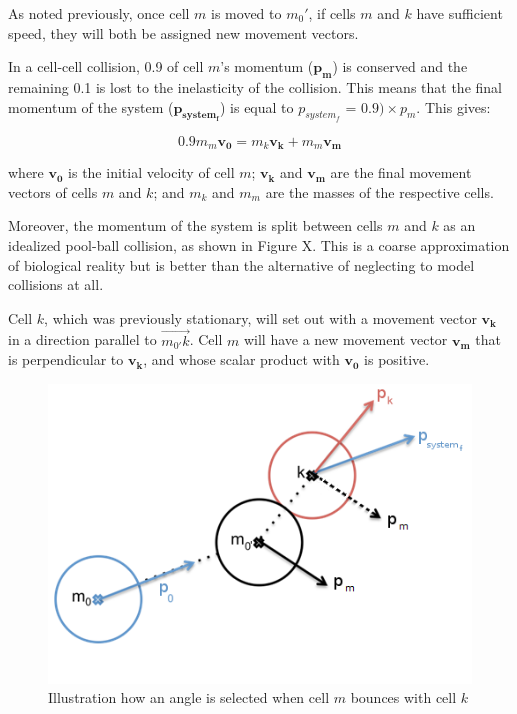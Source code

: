 \documentclass[12pt]{article}
\begin{document}
As noted previously, once cell \(m\) is moved to \(m_0'\), if 
cells \(m\) and \(k\) have sufficient speed, they will both be assigned new movement vectors.

In a cell-cell collision, 0.9 of cell \(m\)'s momentum (\(\mathbf{p_m}\)) is conserved and the 
remaining 0.1 is lost to the inelasticity of the collision. This means that the final momentum 
of the system (\(\mathbf{p_{system_f}}\)) is equal to \(p_{system_f}\) = \(0.9) \times p_m\). 
This gives:

\begin{equation}
  0.9m_m\mathbf{v_0} = m_k\mathbf{v_k}+m_m\mathbf{v_m}
\end{equation}

where \(\mathbf{v_0}\) is the initial velocity of cell \(m\);
\(\mathbf{v_k}\) and \(\mathbf{v_m}\) are the final movement vectors of cells \(m\) and \(k\); and \(m_k\) and
\(m_m\) are the masses of the respective cells.

Moreover, the momentum of the system is split between cells \(m\) and \(k\) as an idealized 
pool-ball collision, as shown in Figure X. This is a coarse approximation of biological 
reality but is better than the alternative of neglecting to model collisions at all. 

Cell \(k\), which was previously stationary, will 
set out with a movement vector \(\mathbf{v_k}\) in a direction parallel to \(\overrightarrow{m_{0'}k}\).
Cell \(m\) will have a new movement vector \(\mathbf{v_m}\) 
that is perpendicular to \(\mathbf{v_k}\), and whose scalar product with \(\mathbf{v_0}\) 
is positive.

\begin{figure}[H]
\centering
\includegraphics[width=13cm]{media/cellcollide.png}
\caption{Illustration how an angle is selected when cell \(m\) bounces with cell \(k\)}
\end{figure}
\end{document}
